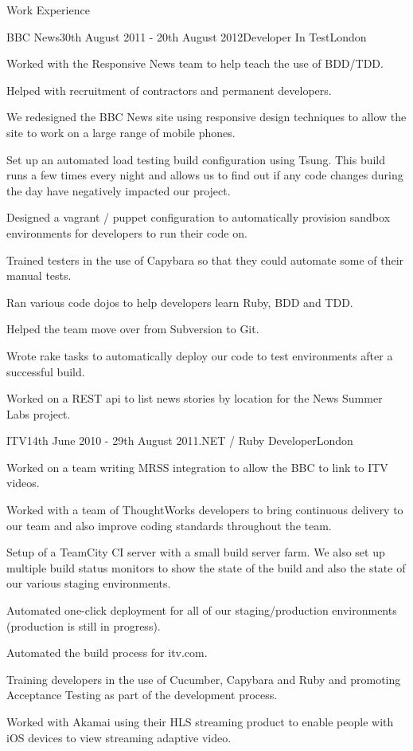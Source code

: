 \documentclass{resume}
\begin{document}
\begin{rSection}{Work Experience}
    \begin{rSubsection}{BBC News}{30th August 2011 - 20th August 2012}{Developer In Test}{London}
      \item Worked with the Responsive News team to help teach the use of BDD/TDD.
      \item Helped with recruitment of contractors and permanent developers.
      \item We redesigned the BBC News site using responsive design techniques to allow the site to work on a large range of mobile phones.
      \item Set up an automated load testing build configuration using Tsung. This build runs a few times every night and allows us to find out if any code changes during the day have negatively impacted our project.
      \item Designed a vagrant / puppet configuration to automatically provision sandbox environments for developers to run their code on.
      \item Trained testers in the use of Capybara so that they could automate some of their manual tests.
      \item Ran various code dojos to help developers learn Ruby, BDD and TDD.
      \item Helped the team move over from Subversion to Git.
      \item Wrote rake tasks to automatically deploy our code to test environments after a successful build.
      \item Worked on a REST api to list news stories by location for the News Summer Labs project.
    \end{rSubsection}

    \begin{rSubsection}{ITV}{14th June 2010 - 29th August 2011}{.NET / Ruby Developer}{London}
      \item Worked on a team writing MRSS integration to allow the BBC to link to ITV videos.
      \item Worked with a team of ThoughtWorks developers to bring continuous delivery to our team and also improve coding standards throughout the team.
      \item Setup of a TeamCity CI server with a small build server farm. We also set up multiple build status monitors to show the state of the build and also the state of our various staging environments.
      \item Automated one-click deployment for all of our staging/production environments (production is still in progress).
      \item Automated the build process for itv.com.
      \item Training developers in the use of Cucumber, Capybara and Ruby and promoting Acceptance Testing as part of the development process.
      \item Worked with Akamai using their HLS streaming product to enable people with iOS devices to view streaming adaptive video.
    \end{rSubsection}


\end{rSection}
\end{document}
